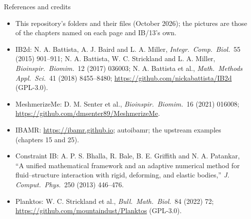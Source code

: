 \documentclass[aspectratio=169,11pt]{beamer}
\begin{document}
\begin{frame}{References and credits}
\label{fr:refs}
\footnotesize
\begin{itemize}\setlength{\itemsep}{2pt}
  \item This repository's  folders and their  files (October 2026); the pictures are those of the chapters named on each page and IB/13's own.
  \item IB2d: N. A. Battista, A. J. Baird and L. A. Miller, \emph{Integr.\ Comp.\ Biol.}\ 55 (2015) 901--911; N. A. Battista, W. C. Strickland and L. A. Miller, \emph{Bioinspir.\ Biomim.}\ 12 (2017) 036003; N. A. Battista et al., \emph{Math.\ Methods Appl.\ Sci.}\ 41 (2018) 8455--8480; \url{https://github.com/nickabattista/IB2d} (GPL-3.0).
  \item MeshmerizeMe: D. M. Senter et al., \emph{Bioinspir.\ Biomim.}\ 16 (2021) 016008; \url{https://github.com/dmsenter89/MeshmerizeMe}.
  \item IBAMR: \url{https://ibamr.github.io}; autoibamr; the upstream examples (chapters 15 and 25).
  \item Constraint IB: A. P. S. Bhalla, R. Bale, B. E. Griffith and N. A. Patankar, ``A unified mathematical framework and an adaptive numerical method for fluid--structure interaction with rigid, deforming, and elastic bodies,'' \emph{J. Comput.\ Phys.}\ 250 (2013) 446--476.
  \item Planktos: W. C. Strickland et al., \emph{Bull.\ Math.\ Biol.}\ 84 (2022) 72; \url{https://github.com/mountaindust/Planktos} (GPL-3.0).
\end{itemize}
\end{frame}
\end{document}
